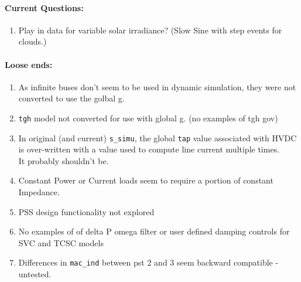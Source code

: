 \documentclass[12pt]{article}
\begin{document}
\begin{multicols}{2}
\begin{enumerate}
	\end{enumerate}



\paragraph{Current Questions:}
	\begin{enumerate}
	\itemsep0em 
	
	
	\item Play in data for variable solar irradiance? (Slow Sine with step events for clouds.)
	
	\end{enumerate}	

\paragraph{Loose ends:} %
	\begin{enumerate}
	\item As infinite buses don't seem to be used in dynamic simulation, they were not converted to use the golbal g.
		\item \verb|tgh| model not converted for use with global g. (no examples of tgh gov)
		\item In original (and current) \verb|s_simu|, the global \verb|tap| value associated with HVDC is over-written with  a value used to compute line current multiple times. \\It probably shouldn't be.
		\item Constant Power or Current loads seem to require a portion of constant Impedance.
		\item PSS design functionality not explored
		\item No examples of of delta P omega filter or user defined damping controls for SVC and TCSC models
		\item Differences in \verb|mac_ind| between pst 2 and 3 seem backward compatible - untested.
	\end{enumerate}
\vfill\null

\end{multicols}
\end{document}
